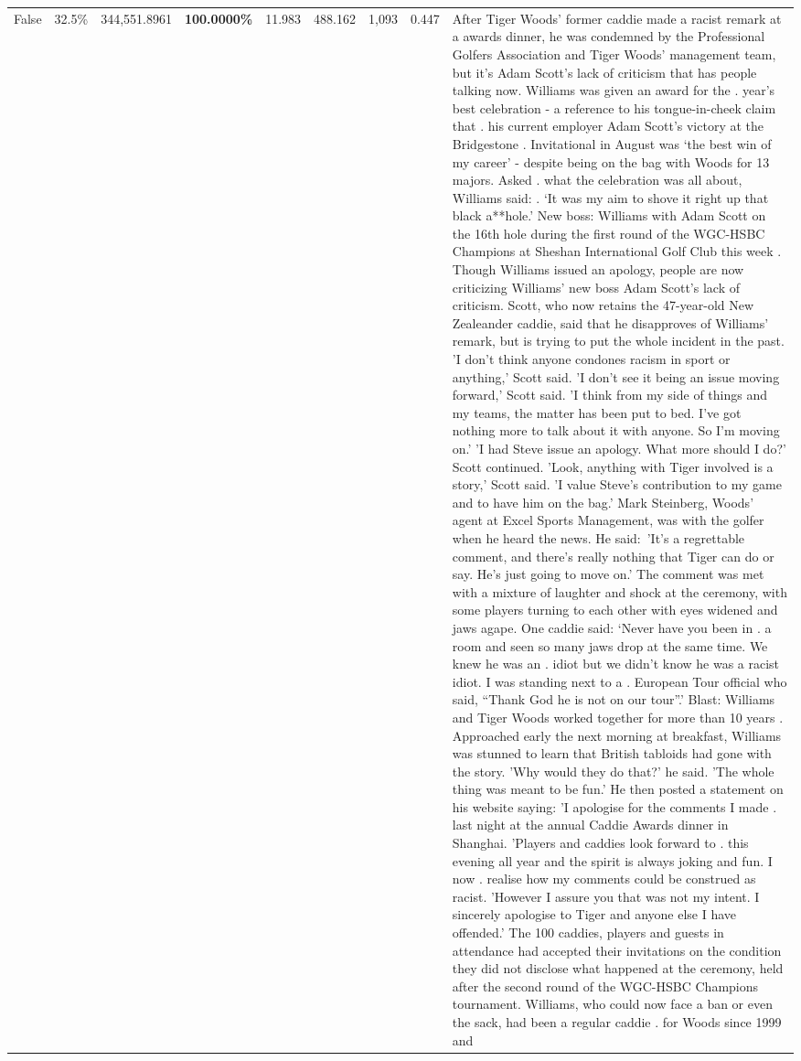 \begin{table}[H]
\begin{tabular}{lllrlllll}
False & 32.5\% & 344,551.8961 & \bfseries \color{red} 100.0000\% & 11.983 & 488.162 & 1,093 & 0.447 & After Tiger Woods' former caddie made a racist remark at a awards dinner, he was condemned by the Professional Golfers Association and Tiger Woods' management team, but it's Adam Scott's lack of criticism that has people talking now. Williams was given an award for the . year’s best celebration - a reference to his tongue-in-cheek claim that . his current employer Adam Scott’s victory at the Bridgestone . Invitational in August was ‘the best win of my career’ - despite being on the bag with Woods for 13 majors. Asked . what the celebration was all about, Williams said: . ‘It was my aim to shove it right up that black a**hole.’ New boss: Williams with Adam Scott  on the 16th hole during the first round of the WGC-HSBC Champions at Sheshan International Golf Club this week . Though Williams issued an apology, people are now criticizing Williams' new boss Adam Scott's lack of criticism. Scott, who now retains the 47-year-old New Zealeander caddie, said that he disapproves of Williams' remark, but is trying to put the whole incident in the past. 'I don't think anyone condones racism in sport or anything,' Scott said. 'I don't see it being an issue moving forward,' Scott said. 'I think from my side of things and my teams, the matter has been put to bed. I've got nothing more to talk about it with anyone. So I'm moving on.' 'I had Steve issue an apology. What more should I do?' Scott continued. 'Look, anything with Tiger involved is a story,' Scott said. 'I value Steve's contribution to my game and to have him on the bag.' Mark Steinberg, Woods' agent at Excel Sports Management, was with the golfer when he heard the news. He said: 'It's a regrettable comment, and there's really nothing that Tiger can do or say. He's just going to move on.' The comment was met with a mixture of laughter and shock at the ceremony, with some players turning to each other with eyes widened and jaws agape. One caddie said: ‘Never have you been in . a room and seen so many jaws drop at the same time. We knew he was an . idiot but we didn’t know he was a racist idiot. I was standing next to a . European Tour official who said, “Thank God he is not on our tour”.’ Blast: Williams and Tiger Woods worked together for more than 10 years . Approached early the next morning at breakfast, Williams was stunned to learn that British tabloids had gone with the story. 'Why would they do that?' he said. 'The whole thing was meant to be fun.' He then posted a statement on his website saying: 'I apologise for the comments I made . last night at the annual Caddie Awards dinner in Shanghai. 'Players and caddies look forward to . this evening all year and the spirit is always joking and fun. I now . realise how my comments could be construed as racist. 'However I assure you that was not my intent. I sincerely apologise to Tiger and anyone else I have offended.' The 100 caddies, players and guests in attendance had accepted their invitations on the condition they did not disclose what happened at the ceremony, held after the second round of the WGC-HSBC Champions tournament. Williams, who could now face a ban or even the sack, had been a regular caddie . for Woods since 1999 and 
\end{tabular}
\end{table}
